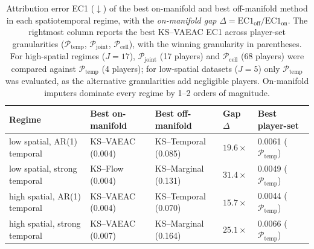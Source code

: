 \begin{table}[t]
\centering\small
\caption{Attribution error EC1 ($\downarrow$) of the best on-manifold and best off-manifold method in each spatiotemporal regime, with the \emph{on-manifold gap} $\Delta = \mathrm{EC1}_\mathrm{off} / \mathrm{EC1}_\mathrm{on}$.  The rightmost column reports the best KS--VAEAC EC1 across player-set granularities ($\mathcal{P}_\text{temp}$, $\mathcal{P}_\text{joint}$, $\mathcal{P}_\text{cell}$), with the winning granularity in parentheses.  For high-spatial regimes ($J{=}17$), $\mathcal{P}_\text{joint}$ (17 players) and $\mathcal{P}_\text{cell}$ (68 players) were compared against $\mathcal{P}_\text{temp}$ (4 players); for low-spatial datasets ($J{=}5$) only $\mathcal{P}_\text{temp}$ was evaluated, as the alternative granularities add negligible players.  On-manifold imputers dominate every regime by 1--2 orders of magnitude.}
\label{tab:winners}
\begin{tabular}{lllll}
\toprule
Regime & Best on-manifold & Best off-manifold & Gap $\Delta$ & Best player-set \\
\midrule
low spatial, AR(1) temporal & KS--VAEAC (0.004) & KS--Temporal (0.085) & $19.6\times$ & 0.0061 ($\mathcal{P}_\text{temp}$) \\
low spatial, strong temporal & KS--Flow (0.004) & KS--Marginal (0.131) & $31.4\times$ & 0.0049 ($\mathcal{P}_\text{temp}$) \\
high spatial, AR(1) temporal & KS--VAEAC (0.004) & KS--Temporal (0.070) & $15.7\times$ & 0.0044 ($\mathcal{P}_\text{temp}$) \\
high spatial, strong temporal & KS--VAEAC (0.007) & KS--Marginal (0.164) & $25.1\times$ & 0.0066 ($\mathcal{P}_\text{temp}$) \\
\bottomrule
\end{tabular}
\end{table}
